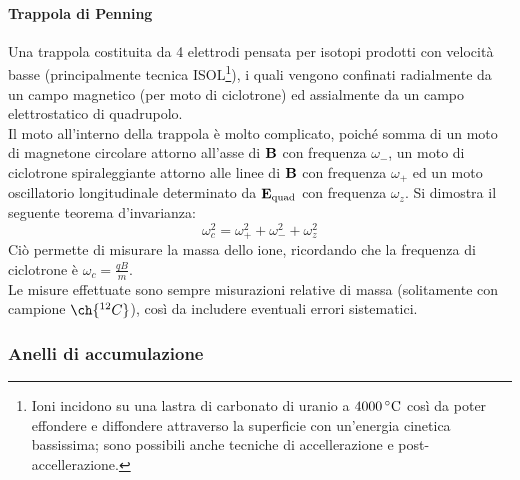 \paragraph{Trappola di Penning}

Una trappola costituita da 4 elettrodi pensata per isotopi prodotti con velocità basse (principalmente tecnica ISOL\footnote{Ioni incidono su una lastra di carbonato di uranio a $ 4000\,^{\circ}\text{C}$ così da poter effondere e diffondere attraverso la superficie con un'energia cinetica bassissima; sono possibili anche tecniche di accellerazione e post-accellerazione.}), i quali vengono confinati radialmente da un campo magnetico (per moto di ciclotrone) ed assialmente da un campo elettrostatico di quadrupolo.\\
Il moto all'interno della trappola è molto complicato, poiché somma di un moto di magnetone circolare attorno all'asse di $ \mathbf{B} $ con frequenza $ \omega_- $, un moto di ciclotrone spiraleggiante attorno alle linee di $ \mathbf{B} $ con frequenza $ \omega_+ $ ed un moto oscillatorio longitudinale determinato da $ \mathbf{E}_{\text{quad}} $ con frequenza $ \omega_z $. Si dimostra il seguente teorema d'invarianza:
\begin{equation}
	\omega_c^2 = \omega_+^2 + \omega_-^2 + \omega_z^2
	\label{eq:1.23}
\end{equation}
Ciò permette di misurare la massa dello ione, ricordando che la frequenza di ciclotrone è $ \omega_c = \frac{q B}{m} $.\\
Le misure effettuate sono sempre misurazioni relative di massa (solitamente con campione $ \ch{^{12}C} $), così da includere eventuali errori sistematici.

\subsubsection{Anelli di accumulazione}

